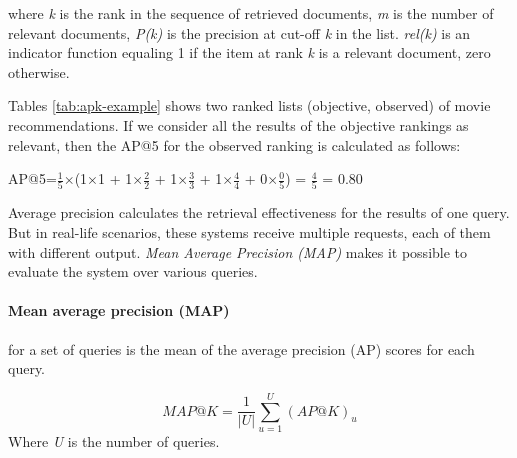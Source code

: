 where \emph{k} is the rank in the sequence of retrieved documents, \emph{m} is the number of relevant documents, \emph{P(k)} is the precision at cut-off \emph{k} in the list. \emph{rel(k)}
is an indicator function equaling 1 if the item at rank \emph{k} is a relevant document, zero otherwise.

Tables \ref{tab:apk-example} shows two ranked lists (objective, observed) of movie recommendations. If we consider all the results of the objective rankings as relevant, then the AP@5 for the observed ranking is calculated as follows:

AP@5=$\frac{1}{5}$$\times$(1$\times$1 + 1$\times$$\frac{2}{2}$ + 1$\times$$\frac{3}{3}$ + 1$\times$$\frac{4}{4}$ + 0$\times$$\frac{0}{5}$) = $\frac{4}{5}$ = 0.80

Average precision calculates the retrieval effectiveness for the results of one query. But in real-life scenarios, these systems receive multiple requests, each of them with different output. \emph{Mean Average Precision (MAP)} makes it possible to evaluate the system over various queries.

\paragraph*{Mean average precision (MAP)} for a set of queries is the mean of the average precision (AP) scores for each query.

\begin{equation}
    MAP@K = \frac{1}{|U|}\sum_{u=1}^{U}(AP@K)_{u}
    \label{eq:map@k}
\end{equation}
Where \emph{U} is the number of queries.

